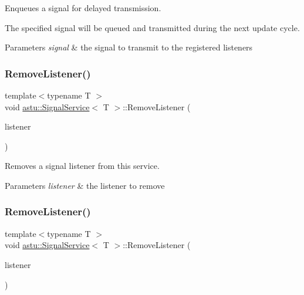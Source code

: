 Enqueues a signal for delayed transmission.

The specified signal will be queued and transmitted during the next update cycle.


\begin{DoxyParams}{Parameters}
{\em signal} & the signal to transmit to the registered listeners \\
\hline
\end{DoxyParams}
\mbox{\label{classastu_1_1SignalService_aea0777f0393a7f3c4dafff9d58934194}} 
\subsubsection{\texorpdfstring{Remove\+Listener()}{RemoveListener()}\hspace{0.1cm}{\footnotesize\ttfamily [1/2]}}
{\footnotesize\ttfamily template$<$typename T $>$ \\
void \hyperlink{classastu_1_1SignalService}{astu\+::\+Signal\+Service}$<$ T $>$\+::Remove\+Listener (\begin{DoxyParamCaption}\item[{const std\+::shared\+\_\+ptr$<$ \hyperlink{classastu_1_1ISignalListener}{I\+Signal\+Listener}$<$ T $>$$>$ \&}]{listener }\end{DoxyParamCaption})\hspace{0.3cm}{\ttfamily [inline]}}

Removes a signal listener from this service.


\begin{DoxyParams}{Parameters}
{\em listener} & the listener to remove \\
\hline
\end{DoxyParams}
\mbox{\label{classastu_1_1SignalService_a06fb3a74d8131e1d105d2006db7f8d64}} 
\subsubsection{\texorpdfstring{Remove\+Listener()}{RemoveListener()}\hspace{0.1cm}{\footnotesize\ttfamily [2/2]}}
{\footnotesize\ttfamily template$<$typename T $>$ \\
void \hyperlink{classastu_1_1SignalService}{astu\+::\+Signal\+Service}$<$ T $>$\+::Remove\+Listener (\begin{DoxyParamCaption}\item[{\hyperlink{classastu_1_1ISignalListener}{I\+Signal\+Listener}$<$ T $>$ \&}]{listener }\end{DoxyParamCaption})\hspace{0.3cm}{\ttfamily [inline]}}

